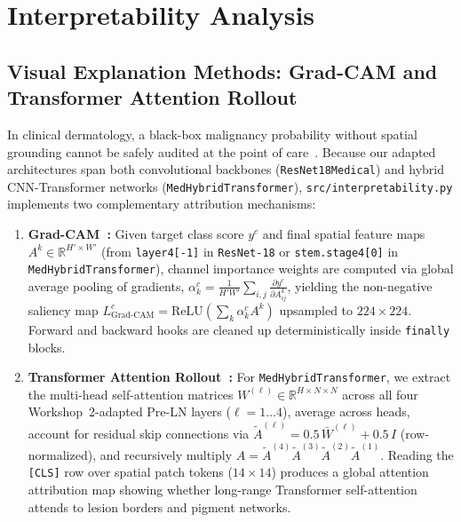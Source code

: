 \section{Interpretability Analysis}
\label{sec:interpretability}

\subsection{Visual Explanation Methods: Grad-CAM and Transformer Attention Rollout}
In clinical dermatology, a black-box malignancy probability without spatial grounding cannot be safely audited at the point of care~\cite{Samek2021explaining,Caruana2015intelligible}. Because our adapted architectures span both convolutional backbones (\texttt{ResNet18Medical}) and hybrid CNN-Transformer networks (\texttt{MedHybridTransformer}), \texttt{src/interpretability.py} implements two complementary attribution mechanisms:

\begin{enumerate}
  \item \textbf{Grad-CAM~\cite{Selvaraju2017grad}:} Given target class score $y^c$ and final spatial feature maps $A^k \in \mathbb{R}^{H'\times W'}$ (from \texttt{layer4[-1]} in \texttt{ResNet-18} or \texttt{stem.stage4[0]} in \texttt{MedHybridTransformer}), channel importance weights are computed via global average pooling of gradients, $\alpha_k^c = \frac{1}{H'W'}\sum_{i,j}\frac{\partial y^c}{\partial A_{ij}^k}$, yielding the non-negative saliency map $L_{\text{Grad-CAM}}^c = \mathrm{ReLU}\!\left(\sum_k \alpha_k^c A^k\right)$ upsampled to $224\times 224$. Forward and backward hooks are cleaned up deterministically inside \texttt{finally} blocks.
  \item \textbf{Transformer Attention Rollout~\cite{Abnar2020quantifying}:} For \texttt{MedHybridTransformer}, we extract the multi-head self-attention matrices $W^{(\ell)} \in \mathbb{R}^{H\times N\times N}$ across all four Workshop~2-adapted Pre-LN layers ($\ell=1\dots 4$), average across heads, account for residual skip connections via $\tilde{A}^{(\ell)} = 0.5\,\bar{W}^{(\ell)} + 0.5\,I$ (row-normalized), and recursively multiply $\hat{A} = \tilde{A}^{(4)}\tilde{A}^{(3)}\tilde{A}^{(2)}\tilde{A}^{(1)}$. Reading the \texttt{[CLS]} row over spatial patch tokens ($14\times 14$) produces a global attention attribution map showing whether long-range Transformer self-attention attends to lesion borders and pigment networks.
\end{enumerate}

